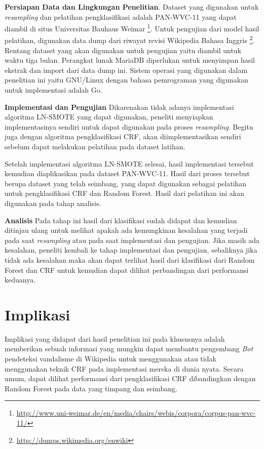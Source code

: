 \documentclass[12pt,a4paper,titlepage]{article}
\begin{document}
\textbf{Persiapan Data dan Lingkungan Penelitian}.
Dataset yang digunakan untuk \textit{resampling} dan pelatihan pengklasifikasi adalah PAN-WVC-11 yang  dapat diambil di situs Universitas Bauhaus Weimar \footnote{\url{http://www.uni-weimar.de/en/media/chairs/webis/corpora/corpus-pan-wvc-11/}}.
Untuk pengujian dari model hasil pelatihan, digunakan data dump dari riwayat revisi Wikipedia Bahasa Inggris \footnote{\url{http://dumps.wikimedia.org/enwiki}}.
Rentang dataset yang akan digunakan untuk pengujian yaitu diambil untuk waktu tiga bulan.
Perangkat lunak MariaDB diperlukan untuk menyimpan hasil ekstrak dan import dari data dump ini.
Sistem operasi yang digunakan dalam penelitian ini yaitu GNU/Linux dengan bahasa pemrograman yang digunakan untuk implementasi adalah Go.

\textbf{Implementasi dan Pengujian}
Dikarenakan tidak adanya implementasi algoritma LN-SMOTE yang dapat digunakan, peneliti menyiapkan implementasinya sendiri untuk dapat digunakan pada proses \textit{resampling}.
Begitu juga dengan algoritma pengklasifikasi CRF, akan diimplementasikan sendiri sebelum dapat melakukan pelatihan pada dataset latihan.

Setelah implementasi algoritma LN-SMOTE selesai, hasil implementasi tersebut kemudian diaplikasikan pada dataset PAN-WVC-11.
Hasil dari proses tersebut berupa dataset yang telah seimbang, yang dapat digunakan sebagai pelatihan untuk pengklasifikasi CRF dan Random Forest.
Hasil dari pelatihan ini akan digunakan pada tahap analisis.

\textbf{Analisis}
Pada tahap ini hasil dari klasifikasi sudah didapat dan kemudian ditinjau ulang untuk melihat apakah ada kemungkinan kesalahan yang terjadi pada saat \textit{resampling} atau pada saat implementasi dan pengujian.
Jika masih ada kesalahan, peneliti kembali ke tahap implementasi dan pengujian, sebaliknya jika tidak ada kesalahan maka akan dapat terlihat hasil dari klasifikasi dari Random Forest dan CRF untuk kemudian dapat dilihat perbandingan dari performansi keduanya.


\section{Implikasi}\label{sec:implikasi}

Implikasi yang didapat dari hasil penelitian ini pada khususnya adalah memberikan sebuah informasi yang mungkin dapat membantu pengembang \textit{Bot} pendeteksi vandalisme di Wikipedia untuk menggunakan atau tidak menggunakan teknik CRF pada implementasi mereka di dunia nyata.
Secara umum, dapat dilihat performansi dari pengklasifikasi CRF dibandingkan dengan Random Forest pada data yang timpang dan seimbang.
\end{document}

